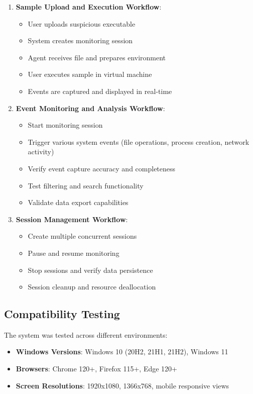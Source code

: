 \begin{enumerate}
    \item \textbf{Sample Upload and Execution Workflow}:
    \begin{itemize}
        \item User uploads suspicious executable
        \item System creates monitoring session
        \item Agent receives file and prepares environment
        \item User executes sample in virtual machine
        \item Events are captured and displayed in real-time
    \end{itemize}
    
    \item \textbf{Event Monitoring and Analysis Workflow}:
    \begin{itemize}
        \item Start monitoring session
        \item Trigger various system events (file operations, process creation, network activity)
        \item Verify event capture accuracy and completeness
        \item Test filtering and search functionality
        \item Validate data export capabilities
    \end{itemize}
    
    \item \textbf{Session Management Workflow}:
    \begin{itemize}
        \item Create multiple concurrent sessions
        \item Pause and resume monitoring
        \item Stop sessions and verify data persistence
        \item Session cleanup and resource deallocation
    \end{itemize}
\end{enumerate}

\subsection{Compatibility Testing}

The system was tested across different environments:

\begin{itemize}
    \item \textbf{Windows Versions}: Windows 10 (20H2, 21H1, 21H2), Windows 11
    \item \textbf{Browsers}: Chrome 120+, Firefox 115+, Edge 120+
    \item \textbf{Screen Resolutions}: 1920x1080, 1366x768, mobile responsive views
\end{itemize}

